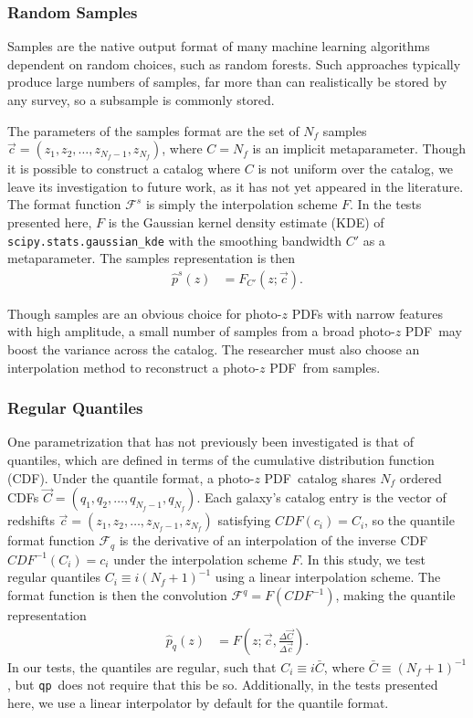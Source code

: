 \documentclass[\docopts]{\docclass}
\newcommand{\qp}{\texttt{qp}}
\newcommand{\pz}{photo-$z$ PDF}
\begin{document}
\subsubsection{Random Samples}
\label{sec:samples}

Samples are the native output format of many machine learning algorithms 
dependent on random choices, such as random forests.
Such approaches typically produce large numbers of samples, far more than can 
realistically be stored by any survey, so a subsample is commonly stored.

The parameters of the samples format are the set of $N_{f}$ samples 
$\vec{c}=(z_{1}, z_{2}, \dots, z_{N_{f}-1}, z_{N_{f}})$, where $C=N_{f}$ is an 
implicit metaparameter.  Though it is possible to construct a catalog where $C$ 
is not uniform over the catalog, we leave its investigation to future work, as 
it has not yet appeared in the literature.  The format function 
$\mathcal{F}^{s}$ is simply the interpolation scheme $F$.  In the tests 
presented here, $F$ is the Gaussian kernel density estimate (KDE) of 
\texttt{scipy.stats.gaussian\_kde} with the smoothing bandwidth $C'$ as a 
metaparameter.  The samples representation is then
\begin{align}
  \label{eq:sampled}
  \hat{p}^{s}(z) &= F_{C'}(z; \vec{c}).
\end{align}

Though samples are an obvious choice for \pz s with narrow features with high 
amplitude, a small number of samples from a broad \pz\ may boost the variance 
across the catalog.  The researcher must also choose an interpolation method to 
reconstruct a \pz\ from samples.

\subsubsection{Regular Quantiles}
\label{sec:quantiles}

One parametrization that has not previously been investigated is that of 
quantiles, which are defined in terms of the cumulative distribution function 
(CDF).  Under the quantile format, a \pz\ catalog shares $N_{f}$ ordered CDFs 
$\vec{C}=(q_{1}, q_{2}, \dots, q_{N_{f}-1}, q_{N_{f}})$.  Each galaxy's catalog 
entry is the vector of redshifts $\vec{c}=(z_{1}, z_{2}, \dots, z_{N_{f}-1}, 
z_{N_{f}})$ satisfying $CDF(c_{i})=C_{i}$, so the quantile format function 
$\mathcal{F}_{q}$ is the derivative of an interpolation of the inverse CDF 
$CDF^{-1}(C_{i})=c_{i}$ under the interpolation scheme $F$.  In this study, we 
test regular quantiles $C_{i}\equiv i(N_{f}+1)^{-1}$ using a linear 
interpolation scheme.  The format function is then the convolution 
$\mathcal{F}^{q}=F(CDF^{-1})$, making the quantile representation
\begin{align}
  \label{eq:quantiles}
  \hat{p}_{q}(z) &= F(z; \vec{c}, \frac{\Delta\vec{C}}{\Delta\vec{c}}).
\end{align}
In our tests, the quantiles are regular, such that $C_{i}\equiv i\bar{C}$, 
where $\bar{C}\equiv(N_{f}+1)^{-1}$, but \qp\ does not require that this be so. 
 Additionally, in the tests presented here, we use a linear interpolator by 
default for the quantile format.
\end{document}
